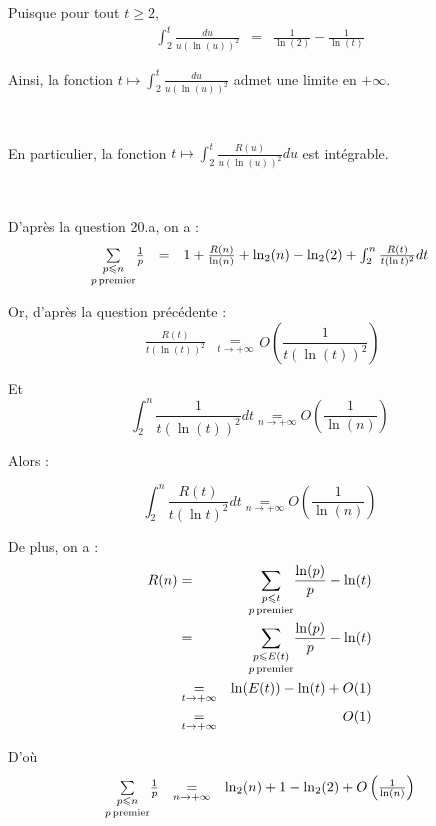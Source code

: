 Puisque pour tout $t \geqslant 2$,
\begin{eqnarray*}
  \int^t_2 \frac{d u}{u (\ln (u))^2} & = & \frac{1}{\ln (2)} - \frac{1}{\ln
  (t)}
\end{eqnarray*}


Ainsi, la fonction $t \longmapsto \int^t_2 \frac{d u}{u (\ln (u))^2}$ admet
une limite en $+ \infty$.

\

En particulier, la fonction $t \longmapsto \int^t_2 \frac{R (u)}{u (\ln
(u))^2} d u$ est int{\'e}grable.

\

 D'apr{\`e}s la question 20.a, on a :
\[ \begin{array}{lll}
     \underset{p \operatorname{premier}}{\underset{p \leqslant n}{\sum}} \frac{1}{p} &
     = & 1 + \frac{R (n)}{\ln (n)} + \ln_2 (n) - \ln_2 (2) + \int^n_2 \frac{R
     (t)}{t (\ln t)^2} d t
   \end{array} \]


Or, d'apr{\`e}s la question pr{\'e}c{\'e}dente :
\[ \begin{array}{ll}
     \frac{R (t)}{t (\ln (t))^2} & \underset{t \rightarrow + \infty}{=}
   \end{array} O \left( \frac{1}{t (\ln (t))^2} \right) \]


Et
\[ \int^n_2 \frac{1}{t (\ln (t))^2} d t \underset{n \rightarrow + \infty}{=} O
   \left( \frac{1}{\ln (n)} \right) \]


Alors :


\[ \int^n_2 \frac{R (t)}{t (\ln t)^2} d t \underset{n \rightarrow + \infty}{=}
   O \left( \frac{1}{\ln (n)} \right) \]


De plus, on a :
\begin{eqnarray*}
  R (n) & = & \underset{p \operatorname{premier}}{\underset{p \leqslant t}{\sum}}
  \frac{\ln (p)}{p} - \ln (t)\\
  & = & \underset{p \operatorname{premier}}{\underset{p \leqslant E (t)}{\sum}}
  \frac{\ln (p)}{p} - \ln (t)\\
  & \underset{t \rightarrow + \infty}{=} & \ln (E (t)) - \ln (t) + O (1)\\
  & \underset{t \rightarrow + \infty}{=} & O (1)
\end{eqnarray*}


D'o{\`u}
\[ \begin{array}{lll}
     \underset{p \operatorname{premier}}{\underset{p \leqslant n}{\sum}} \frac{1}{p} &
     \underset{n \rightarrow + \infty}{=} & \ln_2 (n) + 1 - \ln_2 (2) + O
     \left( \frac{1}{\ln (n)} \right)
   \end{array} \]


